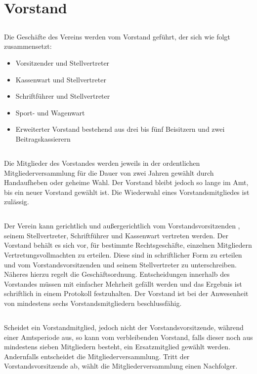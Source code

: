\section{Vorstand}
	\subsection {} Die Geschäfte des Vereins werden vom Vorstand geführt, der sich wie folgt zusammensetzt:
	\begin{itemize}
		\item Vorsitzender und Stellvertreter 
		\item Kassenwart und Stellvertreter
		\item Schriftführer und Stellvertreter 
		\item Sport- und Wagenwart
		\item Erweiterter Vorstand bestehend aus drei bis fünf Beisitzern und zwei Beitragskassierern  
	\end{itemize} 
	
	\subsection {}  Die Mitglieder des Vorstandes werden jeweils in der ordentlichen Mitgliederversammlung für die Dauer von zwei Jahren gewählt durch Handaufheben oder geheime Wahl. Der Vorstand bleibt jedoch so lange im Amt, bis ein neuer Vorstand gewählt ist. Die Wiederwahl eines Vorstandsmitgliedes ist zulässig. 
	
	\subsection {} Der Verein kann gerichtlich und außergerichtlich vom Vorstandsvorsitzenden , seinem Stellvertreter, Schriftführer und Kassenwart vertreten werden. Der Vorstand behält es sich vor, für bestimmte Rechtsgeschäfte, einzelnen Mitgliedern Vertretungsvollmachten zu erteilen. Diese sind in schriftlicher Form zu erteilen und vom Vorstandsvorsitzenden und seinem Stellvertreter zu unterschreiben. Näheres hierzu regelt die Geschäftsordnung. 
	Entscheidungen innerhalb des Vorstandes müssen mit einfacher Mehrheit gefällt werden und das Ergebnis ist schriftlich in einem Protokoll festzuhalten. Der Vorstand ist bei der Anwesenheit von mindestens sechs Vorstandsmitgliedern beschlussfähig. 
	
	\subsection {} Scheidet ein Vorstandmitglied, jedoch nicht der Vorstandsvorsitzende, während einer Amtsperiode aus, so kann vom verbleibenden Vorstand, falls dieser noch aus mindestens sieben Mitgliedern besteht, ein Ersatzmitglied gewählt werden. Andernfalls entscheidet die Mitgliederversammlung. Tritt der Vorstandsvorsitzende ab, wählt die Mitgliederversammlung einen Nachfolger. 

